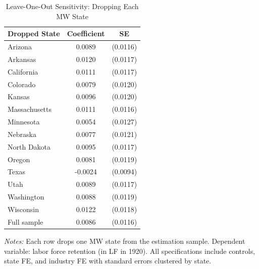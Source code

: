 \begin{table}[t]
\centering
\caption{Leave-One-Out Sensitivity: Dropping Each MW State}
\label{tab:loo}
\begin{tabular}{lcc}
\toprule
Dropped State & Coefficient & SE \\
\midrule
Arizona & 0.0089 & (0.0116) \\
Arkansas & 0.0120 & (0.0117) \\
California & 0.0111 & (0.0117) \\
Colorado & 0.0079 & (0.0120) \\
Kansas & 0.0096 & (0.0120) \\
Massachusetts & 0.0111 & (0.0116) \\
Minnesota & 0.0054 & (0.0127) \\
Nebraska & 0.0077 & (0.0121) \\
North Dakota & 0.0095 & (0.0117) \\
Oregon & 0.0081 & (0.0119) \\
Texas & -0.0024 & (0.0094) \\
Utah & 0.0089 & (0.0117) \\
Washington & 0.0088 & (0.0119) \\
Wisconsin & 0.0122 & (0.0118) \\
\midrule
Full sample & 0.0086 & (0.0116) \\
\bottomrule
\end{tabular}
\begin{tablenotes}
\small
\item \textit{Notes:} Each row drops one MW state from the estimation sample.
Dependent variable: labor force retention (in LF in 1920). All specifications
include controls, state FE, and industry FE with standard errors clustered by state.
\end{tablenotes}
\end{table}
